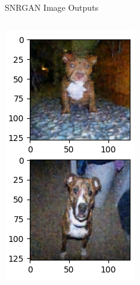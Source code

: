 \begin{frame}{SNRGAN Image Outputs}
    \vspace{0.3em} 
    \begin{columns}
        \begin{column}{0.33\textwidth}
            \includegraphics[width=\linewidth,height=0.6\textheight,keepaspectratio]{images/img3.png}

\end{column}
\end{columns}
\end{frame}
